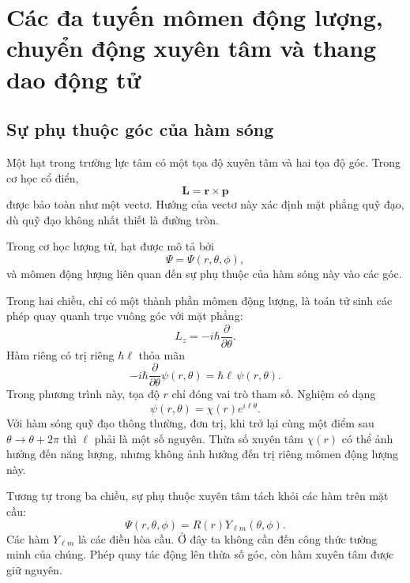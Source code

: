 \chapter{Các đa tuyến mômen động lượng, chuyển động xuyên tâm và thang dao động tử}

\section{Sự phụ thuộc góc của hàm sóng}

Một hạt trong trường lực tâm có một tọa độ xuyên tâm và hai tọa độ góc. Trong cơ học cổ điển,
\begin{equation}
\mathbf L=\mathbf r\times\mathbf p
\end{equation}
được bảo toàn như một vectơ. Hướng của vectơ này xác định mặt phẳng quỹ đạo, dù quỹ đạo không nhất thiết là đường tròn.

Trong cơ học lượng tử, hạt được mô tả bởi
\begin{equation}
\Psi=\Psi(r,\theta,\phi),
\end{equation}
và mômen động lượng liên quan đến sự phụ thuộc của hàm sóng này vào các góc.

Trong hai chiều, chỉ có một thành phần mômen động lượng, là toán tử sinh các phép quay quanh trục vuông góc với mặt phẳng:
\begin{equation}
L_z=-i\hbar\frac{\partial}{\partial\theta}.
\end{equation}
Hàm riêng có trị riêng \(\hbar\ell\) thỏa mãn
\begin{equation}
-i\hbar\frac{\partial}{\partial\theta}\psi(r,\theta)
=\hbar\ell\,\psi(r,\theta).
\end{equation}
Trong phương trình này, tọa độ \(r\) chỉ đóng vai trò tham số. Nghiệm có dạng
\begin{equation}
\psi(r,\theta)=\chi(r)e^{i\ell\theta}.
\end{equation}
Với hàm sóng quỹ đạo thông thường, đơn trị, khi trở lại cùng một điểm sau \(\theta\to\theta+2\pi\) thì \(\ell\) phải là một số nguyên. Thừa số xuyên tâm \(\chi(r)\) có thể ảnh hưởng đến năng lượng, nhưng không ảnh hưởng đến trị riêng mômen động lượng này.

Tương tự trong ba chiều, sự phụ thuộc xuyên tâm tách khỏi các hàm trên mặt cầu:
\begin{equation}
\Psi(r,\theta,\phi)=R(r)Y_{\ell m}(\theta,\phi).
\end{equation}
Các hàm \(Y_{\ell m}\) là các điều hòa cầu. Ở đây ta không cần đến công thức tường minh của chúng. Phép quay tác động lên thừa số góc, còn hàm xuyên tâm được giữ nguyên.

